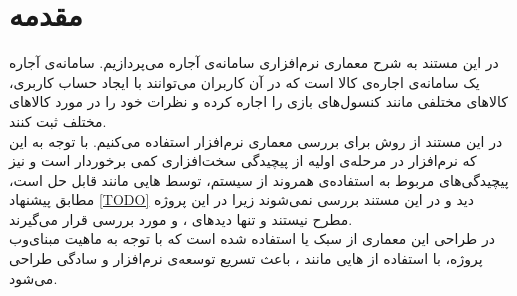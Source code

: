\section*{مقدمه}
در این مستند به شرح معماری نرم‌افزاری سامانه‌ی آجاره می‌پردازیم. سامانه‌ی آجاره یک سامانه‌ی اجاره‌ی کالا است که در آن کاربران می‌توانند با ایجاد حساب کاربری، کالاهای مختلفی مانند کنسول‌های بازی را اجاره کرده و نظرات خود را در مورد کالاهای مختلف ثبت کنند. \\
در این مستند از روش 
برای بررسی معماری نرم‌افزار استفاده می‌کنیم. با توجه به این که نرم‌افزار در مرحله‌ی اولیه‌  از پیچیدگی سخت‌افزاری کمی برخوردار است و نیز  پیچیدگی‌های مربوط به استفاده‌ی همروند از سیستم، توسط 
‌هایی
مانند
قابل حل است، مطابق پیشنهاد
\ref{TODO} %
دید
و
در این مستند بررسی نمی‌شوند زیرا در این پروژه مطرح نیستند و تنها دید‌های
،
و
مورد بررسی قرار می‌گیرند.\\
در طراحی این معماری از سبک 
یا 
استفاده شده است که با توجه به ماهیت مبنای‌وب پروژه، با استفاده از ‌هایی مانند 
، 
باعث تسریع توسعه‌ی نرم‌افزار و سادگی طراحی می‌شود.\\